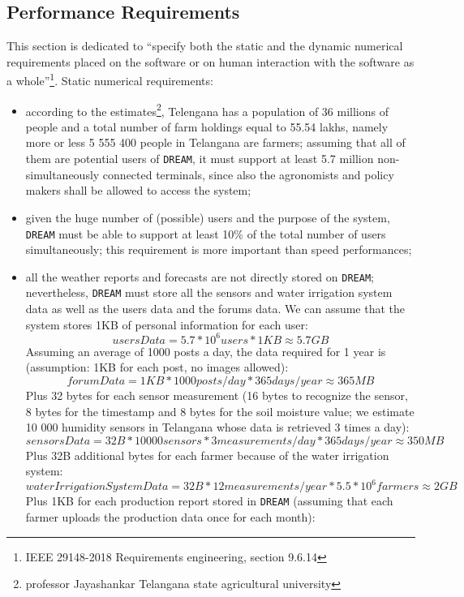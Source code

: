\documentclass{article}
\begin{document}
\color{red}

\newpage
\raggedright
\subsection{Performance Requirements}
This section is dedicated to “specify both the static and the dynamic numerical requirements placed on the software or on human interaction with the software as a whole”\footnote{IEEE 29148-2018 Requirements engineering, section 9.6.14}.
Static numerical requirements:
\begin{itemize}
\item according to the estimates\footnote{professor Jayashankar Telangana state agricultural university}, Telengana has a population of 36 millions of people and a total number of farm holdings equal to 55.54 lakhs, namely more or less 5 555 400 people in Telangana are farmers; assuming that all of them are potential users of \verb|DREAM|, it must support at least 5.7 million non-simultaneously connected terminals, since also the agronomists and policy makers shall be allowed to access the system;
\item given the huge number of (possible) users and the purpose of the system, \verb|DREAM| must be able to support at least 10\% of the total number of users simultaneously; this requirement is more important than speed performances;
\item all the weather reports and forecasts are not directly stored on \verb|DREAM|; nevertheless, \verb|DREAM| must store all the sensors and water irrigation system data as well as the users data and the forums data. 
We can assume that the system stores 1KB of personal information for each user:
\[ usersData = 5.7 * 10^6 users * 1 KB \approx 5.7 GB \]
Assuming an average of 1000 posts a day, the data required for 1 year is (assumption: 1KB for each post, no images allowed):
\[forumData = 1 KB * 1000 posts/day * 365 days/year \approx 365 MB \]
Plus 32 bytes for each sensor measurement (16 bytes to recognize the sensor, 8 bytes for the timestamp and 8 bytes for the soil moisture value; we estimate 10 000 humidity sensors in Telangana whose data is retrieved 3 times a day):
\[sensorsData = 32 B * 10 000 sensors * 3 measurements/day * 365 days/year \approx 350 MB \]
Plus 32B additional bytes for each farmer because of the water irrigation system:
\[waterIrrigationSystemData = 32 B * 12 measurements/year * 5.5 * 10^6 farmers \approx 2 GB \]
Plus 1KB for each production report stored in \verb|DREAM| (assuming that each farmer uploads the production data once for each month):

\end{itemize}
\end{document}
